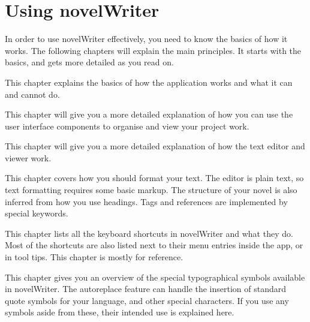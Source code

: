\documentclass[a4paper,11pt,english]{sphinxmanual}
\begin{document}
\section{Using novelWriter}
\label{\detokenize{int_overview:using-novelwriter}}
\sphinxAtStartPar
In order to use novelWriter effectively, you need to know the basics of how it works. The following
chapters will explain the main principles. It starts with the basics, and gets more detailed as you
read on.
\begin{description}
\sphinxAtStartPar
This chapter explains the basics of how the application works and what it can and cannot do.

\sphinxAtStartPar
This chapter will give you a more detailed explanation of how you can use the user interface
components to organise and view your project work.

\sphinxAtStartPar
This chapter will give you a more detailed explanation of how the text editor and viewer work.

\sphinxAtStartPar
This chapter covers how you should format your text. The editor is plain text, so text
formatting requires some basic markup. The structure of your novel is also inferred from how you
use headings. Tags and references are implemented by special keywords.

\sphinxAtStartPar
This chapter lists all the keyboard shortcuts in novelWriter and what they do. Most of the
shortcuts are also listed next to their menu entries inside the app, or in tool tips. This
chapter is mostly for reference.

\sphinxAtStartPar
This chapter gives you an overview of the special typographical symbols available in
novelWriter. The auto\sphinxhyphen{}replace feature can handle the insertion of standard quote symbols for
your language, and other special characters. If you use any symbols aside from these, their
intended use is explained here.

\end{description}
\end{document}
